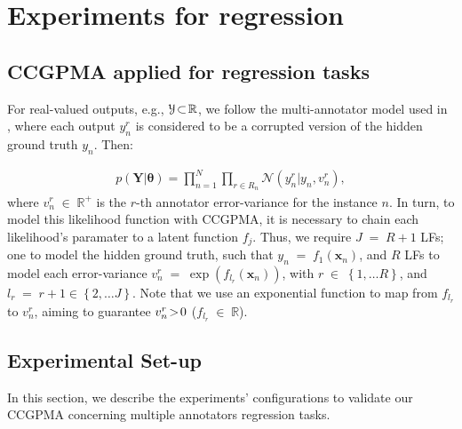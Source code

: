 \documentclass[9pt]{article}
\providecommand{\ve}[1]{{\bm{#1}}}%
\providecommand{\mat}[1]{{\bm{#1}}} %
\newcommand{\Real}{\mathbb{R}}
\DeclareMathOperator{\en}{\!\,\in\!\,}
\DeclareMathOperator{\igual}{\!\,=\!\,}
\providecommand{\s}[1]{\negthinspace#1\negthinspace}%
\providecommand{\ve}[1]{{\mathbf{#1}}}
\providecommand{\mat}[1]{{\mathbf{#1}}}
\newcommand{\gauss}{\mathcal{N}} %
\begin{document}
\section{Experiments for regression}

\subsection{CCGPMA applied for regression tasks}\label{CCGPMAReg}
For real-valued outputs, e.g., $\mathcal{Y} \s{\subset}\Real$, we follow the multi-annotator model used in \cite{raykar2010learning,groot2011learning,xiao2013learning,rodrigues2017learning}, where each output $y_n^r$ is considered to be a corrupted version of the hidden ground truth $y_n$. Then:

\begin{align}
\label{eq:RegLik}
p(\mat{Y}|{\bm{\theta}}) = \prod^N_{n=1}\prod_{r\in R_n}\gauss\left(y_n^r|y_n,v_{n}^r\right),
\end{align}
where $v_{n}^r\en\Real^+$ is the $r$-th annotator error-variance for the instance $n$. In turn, to model this likelihood function with CCGPMA, it is necessary to chain each likelihood's paramater to a latent function $f_j$. Thus, we require $J\igual R+1$ LFs; one to model the hidden ground truth, such that $y_n\igual f_1(\ve{x}_n)$, and $R$ LFs to model each error-variance $v_{n}^r\igual \exp(f_{l_r}(\ve{x}_n))$, with $r\en \left\{1, \dots R\right\}$, and $l_r \igual r+1 \in \left\{2, \dots J\right\}$. Note that we use an exponential function to map from $f_{l_r}$ to $v_{n}^r$, aiming to guarantee $v_{n}^r\s{>}0$ ($f_{l_r}\en \Real$).

\subsection{Experimental Set-up}
In this section, we describe the experiments’ configurations to validate our CCGPMA concerning multiple annotators regression tasks.
\end{document}
